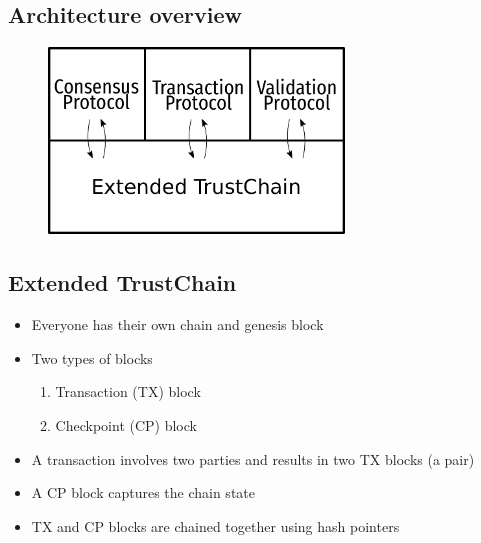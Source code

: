 \documentclass{beamer}
\begin{document}
\subsection{Architecture overview}
\begin{frame}{\subsecname}
  \begin{figure}[h]
  \includegraphics[width=0.7\textwidth]{architecture}
  \centering
  \end{figure}
\end{frame}

\subsection{Extended TrustChain}
\begin{frame}{\subsecname}
  \begin{itemize}
    \item Everyone has their own chain and genesis block
    \item Two types of blocks
      \begin{enumerate}
      \item Transaction (TX) block
      \item Checkpoint (CP) block
      \end{enumerate}
    \item A transaction involves two parties and results in two TX blocks (a pair)
    \item A CP block captures the chain state
    \item TX and CP blocks are chained together using hash pointers
  \end{itemize}
\end{frame}
\end{document}
